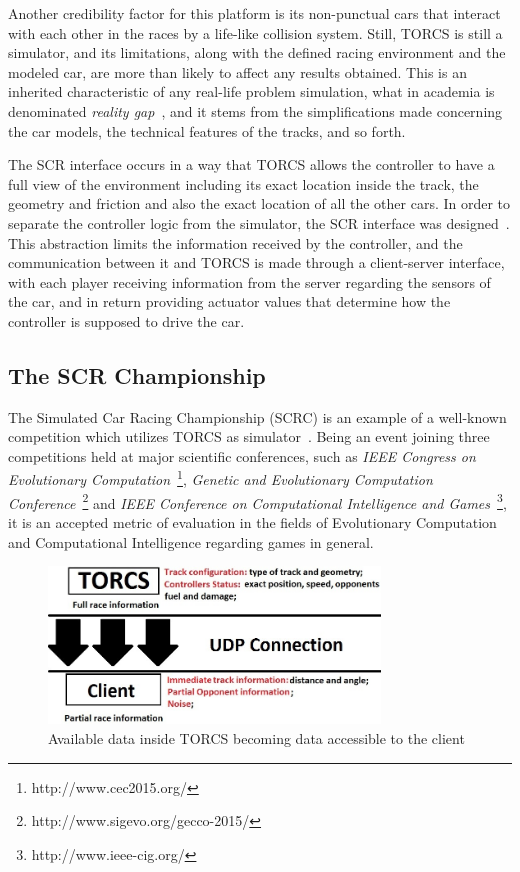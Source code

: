 	Another credibility factor for this platform is its non-punctual cars that interact with each other in the races by a life-like collision system. Still, TORCS is still a simulator, and its limitations, along with the defined racing environment and the modeled car, are more than likely to affect any results obtained. This is an inherited characteristic of any real-life problem simulation, what in academia is denominated \emph{reality gap}~\cite{RG}, and it stems from the simplifications made concerning the car models, the technical features of the tracks, and so forth.
	
	The SCR interface occurs in a way that TORCS allows the controller to have a full view of the environment including its exact location inside the track, the geometry and friction and also the exact location of all the other cars. In order to separate the controller logic from the simulator, the SCR interface was designed~\cite{2009}. This abstraction limits the information received by the controller, and the communication between it and TORCS is made through a client-server interface, with each player receiving information from the server regarding the sensors of the car, and in return providing actuator values that determine how the controller is supposed to drive the car.

\subsection{The SCR Championship} \label{subsec:SCRC}

	The Simulated Car Racing Championship (SCRC) is an example of a well-known competition which utilizes TORCS as simulator~\cite{SCR}. Being an event joining three competitions held at major scientific conferences, such as \emph{IEEE Congress on Evolutionary Computation}~\footnote{http://www.cec2015.org/}, \emph{Genetic and Evolutionary Computation Conference}~\footnote{http://www.sigevo.org/gecco-2015/} and \emph{IEEE Conference on Computational Intelligence and Games}~\footnote{http://www.ieee-cig.org/}, it is an accepted metric of evaluation in the fields of Evolutionary Computation and Computational Intelligence regarding games in general.

   	\begin{figure}[h]
   		
		\centering
		\includegraphics[width=250pt]{Figure1.jpg}
		\caption{Available data inside TORCS becoming data accessible to the client}
		\label{Fig:Comm}
		
	\end{figure}


